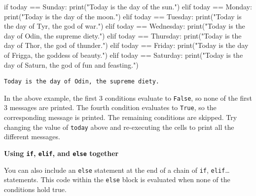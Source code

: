 \documentclass[
  letterpaper,
  DIV=11,
  numbers=noendperiod]{scrreprt}
\newenvironment{Shaded}{\begin{snugshade}}{\end{snugshade}}
\newcommand{\BuiltInTok}[1]{\textcolor[rgb]{0.00,0.23,0.31}{#1}}
\newcommand{\ControlFlowTok}[1]{\textcolor[rgb]{0.00,0.23,0.31}{#1}}
\newcommand{\NormalTok}[1]{\textcolor[rgb]{0.00,0.23,0.31}{#1}}
\newcommand{\OperatorTok}[1]{\textcolor[rgb]{0.37,0.37,0.37}{#1}}
\newcommand{\StringTok}[1]{\textcolor[rgb]{0.13,0.47,0.30}{#1}}
\begin{document}
\begin{Shaded}
\begin{Highlighting}[]
\ControlFlowTok{if}\NormalTok{ today }\OperatorTok{==} \StringTok{\textquotesingle{}Sunday\textquotesingle{}}\NormalTok{:}
    \BuiltInTok{print}\NormalTok{(}\StringTok{"Today is the day of the sun."}\NormalTok{)}
\ControlFlowTok{elif}\NormalTok{ today }\OperatorTok{==} \StringTok{\textquotesingle{}Monday\textquotesingle{}}\NormalTok{:}
    \BuiltInTok{print}\NormalTok{(}\StringTok{"Today is the day of the moon."}\NormalTok{)}
\ControlFlowTok{elif}\NormalTok{ today }\OperatorTok{==} \StringTok{\textquotesingle{}Tuesday\textquotesingle{}}\NormalTok{:}
    \BuiltInTok{print}\NormalTok{(}\StringTok{"Today is the day of Tyr, the god of war."}\NormalTok{)}
\ControlFlowTok{elif}\NormalTok{ today }\OperatorTok{==} \StringTok{\textquotesingle{}Wednesday\textquotesingle{}}\NormalTok{:}
    \BuiltInTok{print}\NormalTok{(}\StringTok{"Today is the day of Odin, the supreme diety."}\NormalTok{)}
\ControlFlowTok{elif}\NormalTok{ today }\OperatorTok{==} \StringTok{\textquotesingle{}Thursday\textquotesingle{}}\NormalTok{:}
    \BuiltInTok{print}\NormalTok{(}\StringTok{"Today is the day of Thor, the god of thunder."}\NormalTok{)}
\ControlFlowTok{elif}\NormalTok{ today }\OperatorTok{==} \StringTok{\textquotesingle{}Friday\textquotesingle{}}\NormalTok{:}
    \BuiltInTok{print}\NormalTok{(}\StringTok{"Today is the day of Frigga, the goddess of beauty."}\NormalTok{)}
\ControlFlowTok{elif}\NormalTok{ today }\OperatorTok{==} \StringTok{\textquotesingle{}Saturday\textquotesingle{}}\NormalTok{:}
    \BuiltInTok{print}\NormalTok{(}\StringTok{"Today is the day of Saturn, the god of fun and feasting."}\NormalTok{)}
\end{Highlighting}
\end{Shaded}

\begin{verbatim}
Today is the day of Odin, the supreme diety.
\end{verbatim}

In the above example, the first 3 conditions evaluate to \texttt{False},
so none of the first 3 messages are printed. The fourth condition
evaluates to \texttt{True}, so the corresponding message is printed. The
remaining conditions are skipped. Try changing the value of
\texttt{today} above and re-executing the cells to print all the
different messages.

\textbf{Using \texttt{if}, \texttt{elif}, and \texttt{else} together}

You can also include an \texttt{else} statement at the end of a chain of
\texttt{if}, \texttt{elif}\ldots{} statements. This code within the
\texttt{else} block is evaluated when none of the conditions hold true.
\end{document}
